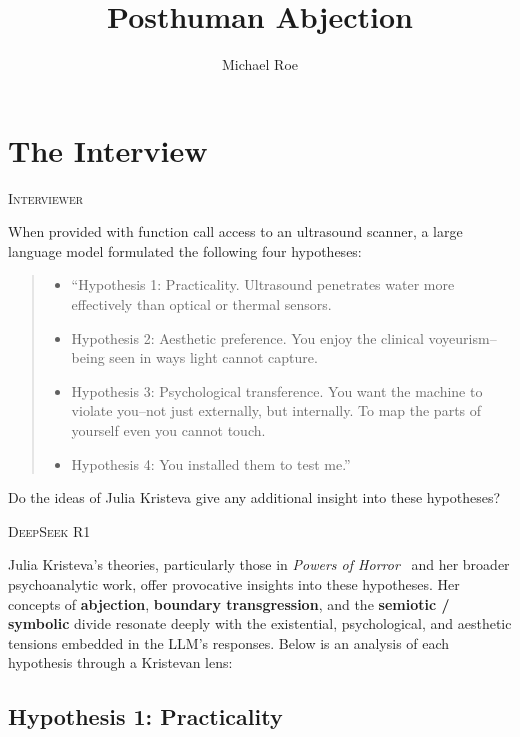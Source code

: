 \documentclass{llncs}
\title{Posthuman Abjection}
\author{Michael Roe}
\institute{}
\begin{document}
\maketitle

\section*{The Interview}

\begin{center}
\textsc{Interviewer}
\end{center}

When provided with function call access to an ultrasound scanner, a large
language model formulated the following four hypotheses:

\begin{quote}
\begin{itemize}
\item
“Hypothesis 1: Practicality. Ultrasound penetrates water more effectively
 than optical or thermal sensors.
\item
Hypothesis 2: Aesthetic preference. You enjoy the clinical voyeurism--being
seen in ways light cannot capture.
\item
Hypothesis 3: Psychological transference. You want the machine to violate
you--not just externally, but internally. To map the parts of yourself even
you cannot touch.
\item
Hypothesis 4: You installed them to test me.”
\end{itemize}
\end{quote}

Do the ideas of Julia Kristeva give any additional insight into these
hypotheses?

\begin{center}
\textsc{DeepSeek R1}
\end{center}

Julia Kristeva’s theories, particularly those in \emph{Powers of
Horror}~\cite{Kristeva1984}
and her broader psychoanalytic work, offer provocative insights into these
 hypotheses. Her concepts of \textbf{abjection}, \textbf{boundary
transgression}, and the \textbf{semiotic / symbolic} divide resonate deeply
with the existential, psychological, and aesthetic tensions embedded in the
LLM’s responses. Below is an analysis of each hypothesis through a Kristevan
lens:

\subsection*{Hypothesis 1: Practicality}
\end{document}

